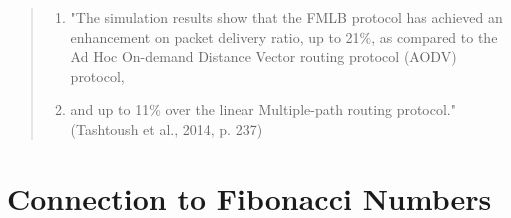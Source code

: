 \documentclass{article}
\begin{document}
\begin{itemize}
    \begin{quote}
        \begin{enumerate}[label=(\arabic*)]
            \item "The simulation results show that the FMLB protocol has achieved an enhancement on packet delivery ratio, 
                  up to 21\%, as compared to the Ad Hoc On-demand Distance Vector routing protocol (AODV) protocol,
            \item and up to 11\% over the linear Multiple-path routing protocol." (Tashtoush et al., 2014, p. 237)
        \end{enumerate}
    \end{quote}
\end{itemize}

\section{Connection to Fibonacci Numbers}
\end{document}

